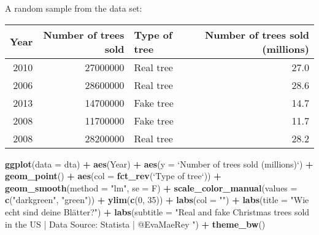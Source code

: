 \documentclass[]{book}
\newenvironment{Shaded}{\begin{snugshade}}{\end{snugshade}}
\newcommand{\KeywordTok}[1]{\textcolor[rgb]{0.13,0.29,0.53}{\textbf{#1}}}
\newcommand{\DataTypeTok}[1]{\textcolor[rgb]{0.13,0.29,0.53}{#1}}
\newcommand{\DecValTok}[1]{\textcolor[rgb]{0.00,0.00,0.81}{#1}}
\newcommand{\StringTok}[1]{\textcolor[rgb]{0.31,0.60,0.02}{#1}}
\newcommand{\OperatorTok}[1]{\textcolor[rgb]{0.81,0.36,0.00}{\textbf{#1}}}
\newcommand{\NormalTok}[1]{#1}
\theoremstyle{definition}
\theoremstyle{definition}
\theoremstyle{definition}
\theoremstyle{remark}
\begin{document}
A random sample from the data set:

\begin{tabular}{r|r|l|r}
\hline
Year & Number of trees sold & Type of tree & Number of trees sold (millions)\\
\hline
2010 & 27000000 & Real tree & 27.0\\
\hline
2006 & 28600000 & Real tree & 28.6\\
\hline
2013 & 14700000 & Fake tree & 14.7\\
\hline
2008 & 11700000 & Fake tree & 11.7\\
\hline
2008 & 28200000 & Real tree & 28.2\\
\hline
\end{tabular}

\begin{Shaded}
\begin{Highlighting}[]
\KeywordTok{ggplot}\NormalTok{(}\DataTypeTok{data =}\NormalTok{ dta) }\OperatorTok{+}
\StringTok{  }\KeywordTok{aes}\NormalTok{(Year) }\OperatorTok{+}
\StringTok{  }\KeywordTok{aes}\NormalTok{(}\DataTypeTok{y =} \StringTok{`}\DataTypeTok{Number of trees sold (millions)}\StringTok{`}\NormalTok{) }\OperatorTok{+}
\StringTok{  }\KeywordTok{geom_point}\NormalTok{() }\OperatorTok{+}
\StringTok{  }\KeywordTok{aes}\NormalTok{(}\DataTypeTok{col =} \KeywordTok{fct_rev}\NormalTok{(}\StringTok{`}\DataTypeTok{Type of tree}\StringTok{`}\NormalTok{)) }\OperatorTok{+}
\StringTok{  }\KeywordTok{geom_smooth}\NormalTok{(}\DataTypeTok{method =} \StringTok{"lm"}\NormalTok{, }\DataTypeTok{se =}\NormalTok{ F) }\OperatorTok{+}
\StringTok{  }\KeywordTok{scale_color_manual}\NormalTok{(}\DataTypeTok{values =} \KeywordTok{c}\NormalTok{(}\StringTok{"darkgreen"}\NormalTok{, }\StringTok{"green"}\NormalTok{)) }\OperatorTok{+}
\StringTok{  }\KeywordTok{ylim}\NormalTok{(}\KeywordTok{c}\NormalTok{(}\DecValTok{0}\NormalTok{, }\DecValTok{35}\NormalTok{)) }\OperatorTok{+}
\StringTok{  }\KeywordTok{labs}\NormalTok{(}\DataTypeTok{col =} \StringTok{""}\NormalTok{) }\OperatorTok{+}
\StringTok{  }\KeywordTok{labs}\NormalTok{(}\DataTypeTok{title =} \StringTok{"Wie echt sind deine Blätter?"}\NormalTok{) }\OperatorTok{+}
\StringTok{  }\KeywordTok{labs}\NormalTok{(}\DataTypeTok{subtitle =} \StringTok{"Real and fake Christmas trees sold in the US | Data Source: Statista | @EvaMaeRey "}\NormalTok{) }\OperatorTok{+}
\StringTok{  }\KeywordTok{theme_bw}\NormalTok{() }
\end{Highlighting}
\end{Shaded}
\end{document}
